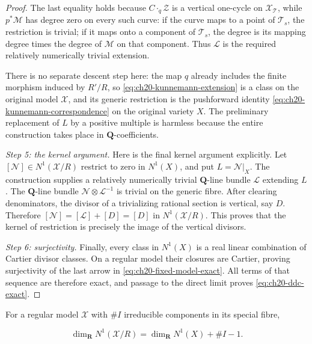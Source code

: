 \begin{proof}
The last equality holds because $C\mathbin{\cdot_q}\mathcal Z$ is a
vertical one-cycle on $\mathcal X_{\mathcal T}$, while
$p^*\mathcal M$ has degree zero on every such curve: if the curve maps to
a point of $\mathcal T_s$, the restriction is trivial; if it maps onto a
component of $\mathcal T_s$, the degree is its mapping degree times the
degree of $\mathcal M$ on that component.  Thus $\mathcal L$ is the
required relatively numerically trivial extension.

There is no separate descent step here: the map $q$ already includes the
finite morphism induced by $R'/R$, so
\eqref{eq:ch20-kunnemann-extension} is a class on the original model
$\mathcal X$, and its generic restriction is the pushforward identity
\eqref{eq:ch20-kunnemann-correspondence} on the original variety $X$.
The preliminary replacement of $L$ by a positive multiple is harmless
because the entire construction takes place in $\mathbf Q$-coefficients.

\emph{Step 5: the kernel argument.}
Here is the final kernel argument explicitly.  Let
$[\mathcal N]\in N^1(\mathcal X/R)$ restrict to zero in $N^1(X)$, and
put $L=\mathcal N|_X$.  The construction supplies a relatively
numerically trivial $\mathbf Q$-line bundle $\mathcal L$ extending
$L$.  The $\mathbf Q$-line bundle
$\mathcal N\otimes\mathcal L^{-1}$ is trivial on the generic fibre.
After clearing denominators, the divisor of a trivializing rational section
is vertical, say $D$.  Therefore
$[\mathcal N]=[\mathcal L]+[D]=[D]$ in $N^1(\mathcal X/R)$.  This proves
that the kernel of restriction is precisely the image of the vertical
divisors.

\emph{Step 6: surjectivity.}
Finally, every class in $N^1(X)$ is a real linear combination of Cartier
divisor classes.  On a regular model their closures are Cartier, proving
surjectivity of the last arrow in
\eqref{eq:ch20-fixed-model-exact}.  All terms of that sequence are therefore
exact, and passage to the direct limit proves
\eqref{eq:ch20-ddc-exact}.
\end{proof}

\begin{corollary}
\label{cor:ch20-dimension-count}
For a regular model $\mathcal X$ with $\#I$ irreducible components in
its special fibre,

\begin{equation}
\label{eq:ch20-dimension-count}
 \dim_{\mathbf R}N^1(\mathcal X/R)
 =\dim_{\mathbf R}N^1(X)+\#I-1 .
\end{equation}
\end{corollary}

